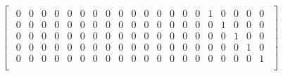 \begin{landscape}
\begin{equation}
{\begin{bmatrix}
\begin{array}{ccccc|ccccc|ccccc|ccccc}
         \hline
       0 & 0 & 0 & 0 & 0 & 0 & 0 & 0 & 0 & 0 & 0 & 0 & 0 & 0 & 0 & 1 & 0 & 0 & 0 & 0 \\ %
       0 & 0 & 0 & 0 & 0 & 0 & 0 & 0 & 0 & 0 & 0 & 0 & 0 & 0 & 0 & 0 & 1 & 0 & 0 & 0 \\ %
       0 & 0 & 0 & 0 & 0 & 0 & 0 & 0 & 0 & 0 & 0 & 0 & 0 & 0 & 0 & 0 & 0 & 1 & 0 & 0 \\ %
       0 & 0 & 0 & 0 & 0 & 0 & 0 & 0 & 0 & 0 & 0 & 0 & 0 & 0 & 0 & 0 & 0 & 0 & 1 & 0 \\ %
       0 & 0 & 0 & 0 & 0 & 0 & 0 & 0 & 0 & 0 & 0 & 0 & 0 & 0 & 0 & 0 & 0 & 0 & 0 & 1 \\ %
   \end{array}
    \end{bmatrix}
\label{eq:2D45A}
}
\end{equation}


\end{landscape}
